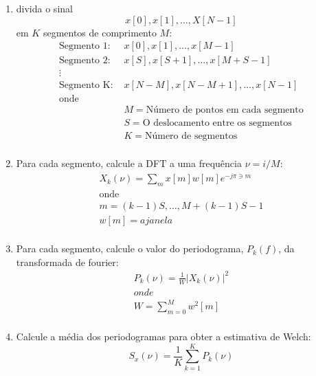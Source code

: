 \begin{enumerate}
	\item divida o sinal 
	\begin{equation*}
	x[0],x[1],\ldots,X[N-1]
	\end{equation*}
	em $K$ segmentos de comprimento $M$:
	\begin{equation*}
	\begin{aligned}
	\text{Segmento 1: } &x[0],x[1],\ldots,x[M-1]\\
	\text{Segmento 2: } & x[S],x[S+1],\ldots,x[M+S-1]\\
	\vdots & \\
	\text{Segmento K: } & x[N-M],x[N-M+1],\ldots,x[N-1]\\
	\text{onde} &\\
	&M= \text{N\'umero de pontos em cada segmento}\\
	&S= \text{O deslocamento entre os segmentos}\\
	&K = \text{N\'umero de segmentos} \\
	\end{aligned}
	\end{equation*}
	\item Para cada segmento, calcule a \ac{DFT} a uma frequ\^encia $\nu=i/M$:
	\begin{equation*}
	\begin{aligned}
	X_k(\nu)= \sum_m x[m]w[m]e^{-j\pi \ni m}\\
	\text{onde}\\
	m=(k-1)S,\ldots,M+(k-1)S-1\\
	w[m]= a janela\\
	\end{aligned}
	\end{equation*}
	\item Para cada segmento, calcule o valor do periodograma, $P_k(f)$, da transformada de fourier:
	\begin{equation*}
	\begin{aligned}
	P_k(\nu) = \frac{1}{W} {\left| X_k (\nu) \right|}^{2}\\
	onde\\
	W= \sum_{m=0}^{M} w^2 [m]\\  
	\end{aligned}
	\end{equation*}
	\item Calcule a m\'edia dos periodogramas para obter a estimativa de Welch:
	\begin{equation*}
	S_x(\nu)=\frac{1}{K} \sum_{k=1}^{K} P_k(\nu)
	\end{equation*}
\end{enumerate}


